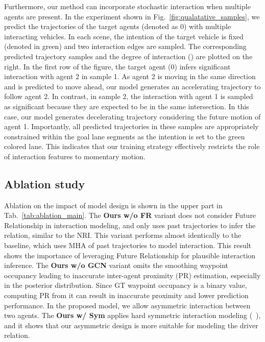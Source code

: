 \documentclass{article} \usepackage{iclr2023_conference,times}
\begin{document}
Furthermore, our method can incorporate stochastic interaction when multiple agents are present.
In the experiment shown in Fig.~\ref{fig:qualatative_samples}, we predict the trajectories of the target agents (denoted as 0) with multiple interacting vehicles.
In each scene, the intention of the target vehicle is fixed (denoted in green) and two interaction edges are sampled. 
The corresponding predicted trajectory samples and the degree of interaction () are plotted on the right.
In the first row of the figure, the target agent (0) infers significant interaction with agent 2 in sample 1.
As agent 2 is moving in the same direction and is predicted to move ahead, our model generates an accelerating trajectory to follow agent 2.
In contrast, in sample 2, the interaction with agent 1 is sampled as significant because they are expected to be in the same intersection.
In this case, our model generates decelerating trajectory considering the future motion of agent 1.
Importantly, all predicted trajectories in these samples are appropriately constrained within the goal lane segments as the intention is set to the green colored lane.
This indicates that our training strategy effectively restricts the role of interaction features to momentary motion.


\subsection{Ablation study}
\label{sec:ablation_study}
Ablation on the impact of model design is shown in the upper part in Tab.~\ref{tab:ablation_main}.
The \textbf{Ours w/o FR} variant does not consider Future Relationship in interaction modeling, and only uses past trajectories to infer the relation, similar to the NRI.
This variant performs almost identically to the baseline, which uses MHA of past trajectories to model interaction. 
This result shows the importance of leveraging Future Relationship for plausible interaction inference.
The \textbf{Ours w/o GCN} variant omits the smoothing waypoint occupancy leading to inaccurate inter-agent proximity (PR) estimation, especially in the posterior distribution.
Since GT waypoint occupancy is a binary value, computing PR from it can result in inaccurate proximity and lower prediction performance.
In the proposed model, we allow asymmetric interaction between two agents.
The \textbf{Ours w/ Sym} applies hard symmetric interaction modeling (~\cite{li2019structure}), and it shows that our asymmetric design is more suitable for modeling the driver relation.
\end{document}
